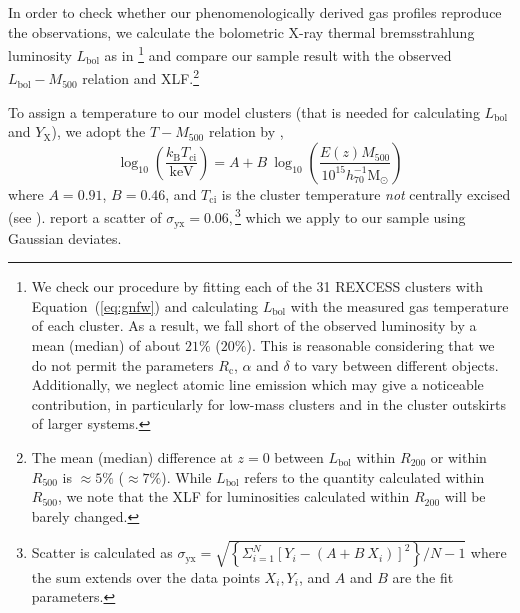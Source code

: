 \documentclass[traditabstract]{aa}
\newcommand{\rmn}{\mathrm}
\begin{document}
In order to check whether our phenomenologically derived gas profiles reproduce
the observations, we calculate the bolometric X-ray thermal bremsstrahlung
luminosity $L_{\rmn{bol}}$ as in \cite{1988xrec.book.....S}\footnote{We check
  our procedure by fitting each of the 31 REXCESS clusters with
  Equation~(\ref{eq:gnfw}) and calculating $L_{\rmn{bol}}$ with the measured gas
  temperature of each cluster. As a result, we fall short of the observed
  luminosity by a mean (median) of about $21\%$ ($20\%$). This is reasonable
  considering that we do not permit the parameters $R_{\rmn{c}}$, $\alpha$ and
  $\delta$ to vary between different objects. Additionally, we neglect atomic
  line emission which may give a noticeable contribution, in particularly for
  low-mass clusters and in the cluster outskirts of larger systems.}  and
compare our sample result with the observed $L_{\rmn{bol}} - M_{500}$ relation
and XLF.\footnote{The mean (median) difference at $z=0$ between
  $L_{\rmn{bol}}$ within $R_{200}$ or within $R_{500}$ is $\approx 5\%$ ($\approx
  7\%$). While $L_{\rmn{bol}}$ refers to the quantity calculated within
  $R_{500}$, we note that the XLF for luminosities calculated within $R_{200}$
  will be barely changed.}

To assign a temperature to our model clusters (that is needed for calculating
$L_{\rmn{bol}}$ and $Y_{\rmn{X}}$), we adopt the $T-M_{500}$ relation by
\cite{2010MNRAS.406.1773M},
\begin{equation}
\log_{10} \left( \frac{k_{\rmn{B}}T_{\rmn{ci}}}{\rmn{keV}} \right) = 
A + B~\log_{10} \left( \frac{E(z) M_{500}}{10^{15} h_{70}^{-1} \rmn{M_{\odot}}} \right)
\label{eq:temp}
\end{equation}
where $A=0.91$, $B=0.46$, and $T_{\rmn{ci}}$ is the cluster temperature \emph{not}
centrally excised (see
\citealp{2010MNRAS.406.1773M}). \cite{2010MNRAS.406.1773M} report a scatter of
$\sigma_{\rmn{yx}} = 0.06,$\footnote{Scatter is calculated as $\sigma_{\rmn{yx}}
  = \sqrt{ \left\{ \Sigma_{i=1}^{N} [Y_{i}-(A+B~X_{i})]^{2}\right\} / N-1}$
  where the sum extends over the data points $X_{i}, Y_{i}$, and $A$ and $B$ are
  the fit parameters.} which we apply to our sample using Gaussian deviates.
\end{document}
